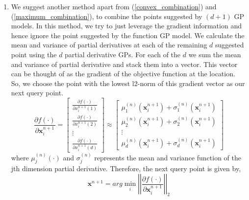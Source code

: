 \documentclass{article}
\begin{document}
\begin{enumerate}
        \item
            We suggest another method apart from (\ref{convex_combination}) and (\ref{maximum_combination}), to combine the points suggested by $(d+1)$ GP 
            models. In this method, we try to just leverage the gradient information and hence ignore the point suggested by the function GP model. We 
            calculate the mean and variance of partial derivatives at each of the remaining $d$ suggested point using the $d$ partial derivative GPs. For each
            of the $d$ we sum the mean and variance of partial derivative and stack them into a vector. This vector can be thought of as the gradient of the 
            objective function at the location. So, we choose the point with the lowest l2-norm of this gradient vector as our next query point. 
            \begin{equation}
                \frac {\partial f(\cdot)}{\partial \textbf{x}_{i}^{n+1}} = \begin{bmatrix}
                    \frac{\partial f(\cdot)}{\partial x_{i}^{n+1}(1)} \\
                    \frac{\partial f(\cdot)}{\partial x_{i}^{n+1}(2)} \\
                    \vdots \\
                    \frac{\partial f(\cdot)}{\partial x_{i}^{n+1}(d)}
                \end{bmatrix} \approx \begin{bmatrix}
                    \mu^{(n)}_{1}(\textbf{x}_{i}^{n+1}) + \sigma^{(n)}_{1}(\textbf{x}_{i}^{n+1}) \\
                    \mu^{(n)}_{2}(\textbf{x}_{i}^{n+1}) + \sigma^{(n)}_{2}(\textbf{x}_{i}^{n+1}) \\
                    \vdots \\
                    \mu^{(n)}_{d}(\textbf{x}_{i}^{n+1}) + \sigma^{(n)}_{d}(\textbf{x}_{i}^{n+1})
                \end{bmatrix}
            \end{equation}
            where $\mu^{(n)}_{j}(\cdot)$ and $\sigma^{(n)}_{j}$ represents the mean and variance function of the jth dimension partial derivative.
            Therefore, the next query point is given by,
            \begin{equation}
                \textbf{x}^{n+1} = arg \min_{i} \left | \left | \frac {\partial f(\cdot)}{\partial \textbf{x}_{i}^{n+1}} \right | \right |_2
            \end{equation}


\end{enumerate}
\end{document}
